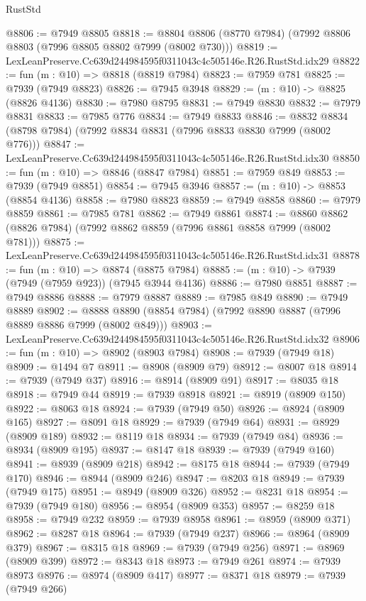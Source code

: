 \begin{lexlean}{RustStd}
\begin{coremodule}
@8806 := @7949 @8805
@8818 := @8804 @8806 (@8770 @7984) (@7992 @8806 @8803 (@7996 @8805 @8802 @7999 (@8002 @730)))
@8819 := LexLeanPreserve.Cc639d244984595f0311043c4c505146e.R26.RustStd.idx29
@8822 := fun (m : @10) => @8818 (@8819 @7984)
@8823 := @7959 @781
@8825 := @7939 (@7949 @8823)
@8826 := @7945 @3948
@8829 := (m : @10) -> @8825 (@8826 @4136)
@8830 := @7980 @8795
@8831 := @7949 @8830
@8832 := @7979 @8831
@8833 := @7985 @776
@8834 := @7949 @8833
@8846 := @8832 @8834 (@8798 @7984) (@7992 @8834 @8831 (@7996 @8833 @8830 @7999 (@8002 @776)))
@8847 := LexLeanPreserve.Cc639d244984595f0311043c4c505146e.R26.RustStd.idx30
@8850 := fun (m : @10) => @8846 (@8847 @7984)
@8851 := @7959 @849
@8853 := @7939 (@7949 @8851)
@8854 := @7945 @3946
@8857 := (m : @10) -> @8853 (@8854 @4136)
@8858 := @7980 @8823
@8859 := @7949 @8858
@8860 := @7979 @8859
@8861 := @7985 @781
@8862 := @7949 @8861
@8874 := @8860 @8862 (@8826 @7984) (@7992 @8862 @8859 (@7996 @8861 @8858 @7999 (@8002 @781)))
@8875 := LexLeanPreserve.Cc639d244984595f0311043c4c505146e.R26.RustStd.idx31
@8878 := fun (m : @10) => @8874 (@8875 @7984)
@8885 := (m : @10) -> @7939 (@7949 (@7959 @923)) (@7945 @3944 @4136)
@8886 := @7980 @8851
@8887 := @7949 @8886
@8888 := @7979 @8887
@8889 := @7985 @849
@8890 := @7949 @8889
@8902 := @8888 @8890 (@8854 @7984) (@7992 @8890 @8887 (@7996 @8889 @8886 @7999 (@8002 @849)))
@8903 := LexLeanPreserve.Cc639d244984595f0311043c4c505146e.R26.RustStd.idx32
@8906 := fun (m : @10) => @8902 (@8903 @7984)
@8908 := @7939 (@7949 @18)
@8909 := @1494 @7
@8911 := @8908 (@8909 @79)
@8912 := @8007 @18
@8914 := @7939 (@7949 @37)
@8916 := @8914 (@8909 @91)
@8917 := @8035 @18
@8918 := @7949 @44
@8919 := @7939 @8918
@8921 := @8919 (@8909 @150)
@8922 := @8063 @18
@8924 := @7939 (@7949 @50)
@8926 := @8924 (@8909 @165)
@8927 := @8091 @18
@8929 := @7939 (@7949 @64)
@8931 := @8929 (@8909 @189)
@8932 := @8119 @18
@8934 := @7939 (@7949 @84)
@8936 := @8934 (@8909 @195)
@8937 := @8147 @18
@8939 := @7939 (@7949 @160)
@8941 := @8939 (@8909 @218)
@8942 := @8175 @18
@8944 := @7939 (@7949 @170)
@8946 := @8944 (@8909 @246)
@8947 := @8203 @18
@8949 := @7939 (@7949 @175)
@8951 := @8949 (@8909 @326)
@8952 := @8231 @18
@8954 := @7939 (@7949 @180)
@8956 := @8954 (@8909 @353)
@8957 := @8259 @18
@8958 := @7949 @232
@8959 := @7939 @8958
@8961 := @8959 (@8909 @371)
@8962 := @8287 @18
@8964 := @7939 (@7949 @237)
@8966 := @8964 (@8909 @379)
@8967 := @8315 @18
@8969 := @7939 (@7949 @256)
@8971 := @8969 (@8909 @399)
@8972 := @8343 @18
@8973 := @7949 @261
@8974 := @7939 @8973
@8976 := @8974 (@8909 @417)
@8977 := @8371 @18
@8979 := @7939 (@7949 @266)

\end{coremodule}
\end{lexlean}
